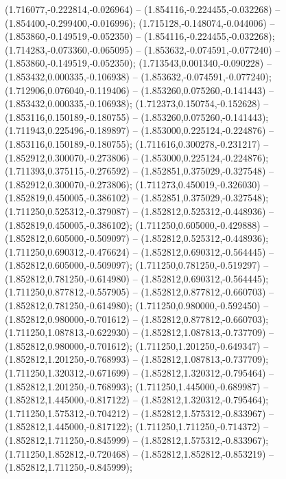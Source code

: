  (1.716077,-0.222814,-0.026964) -- (1.854116,-0.224455,-0.032268) -- (1.854400,-0.299400,-0.016996);
 (1.715128,-0.148074,-0.044006) -- (1.853860,-0.149519,-0.052350) -- (1.854116,-0.224455,-0.032268);
 (1.714283,-0.073360,-0.065095) -- (1.853632,-0.074591,-0.077240) -- (1.853860,-0.149519,-0.052350);
 (1.713543,0.001340,-0.090228) -- (1.853432,0.000335,-0.106938) -- (1.853632,-0.074591,-0.077240);
 (1.712906,0.076040,-0.119406) -- (1.853260,0.075260,-0.141443) -- (1.853432,0.000335,-0.106938);
 (1.712373,0.150754,-0.152628) -- (1.853116,0.150189,-0.180755) -- (1.853260,0.075260,-0.141443);
 (1.711943,0.225496,-0.189897) -- (1.853000,0.225124,-0.224876) -- (1.853116,0.150189,-0.180755);
 (1.711616,0.300278,-0.231217) -- (1.852912,0.300070,-0.273806) -- (1.853000,0.225124,-0.224876);
 (1.711393,0.375115,-0.276592) -- (1.852851,0.375029,-0.327548) -- (1.852912,0.300070,-0.273806);
 (1.711273,0.450019,-0.326030) -- (1.852819,0.450005,-0.386102) -- (1.852851,0.375029,-0.327548);
 (1.711250,0.525312,-0.379087) -- (1.852812,0.525312,-0.448936) -- (1.852819,0.450005,-0.386102);
 (1.711250,0.605000,-0.429888) -- (1.852812,0.605000,-0.509097) -- (1.852812,0.525312,-0.448936);
 (1.711250,0.690312,-0.476624) -- (1.852812,0.690312,-0.564445) -- (1.852812,0.605000,-0.509097);
 (1.711250,0.781250,-0.519297) -- (1.852812,0.781250,-0.614980) -- (1.852812,0.690312,-0.564445);
 (1.711250,0.877812,-0.557905) -- (1.852812,0.877812,-0.660703) -- (1.852812,0.781250,-0.614980);
 (1.711250,0.980000,-0.592450) -- (1.852812,0.980000,-0.701612) -- (1.852812,0.877812,-0.660703);
 (1.711250,1.087813,-0.622930) -- (1.852812,1.087813,-0.737709) -- (1.852812,0.980000,-0.701612);
 (1.711250,1.201250,-0.649347) -- (1.852812,1.201250,-0.768993) -- (1.852812,1.087813,-0.737709);
 (1.711250,1.320312,-0.671699) -- (1.852812,1.320312,-0.795464) -- (1.852812,1.201250,-0.768993);
 (1.711250,1.445000,-0.689987) -- (1.852812,1.445000,-0.817122) -- (1.852812,1.320312,-0.795464);
 (1.711250,1.575312,-0.704212) -- (1.852812,1.575312,-0.833967) -- (1.852812,1.445000,-0.817122);
 (1.711250,1.711250,-0.714372) -- (1.852812,1.711250,-0.845999) -- (1.852812,1.575312,-0.833967);
 (1.711250,1.852812,-0.720468) -- (1.852812,1.852812,-0.853219) -- (1.852812,1.711250,-0.845999);
